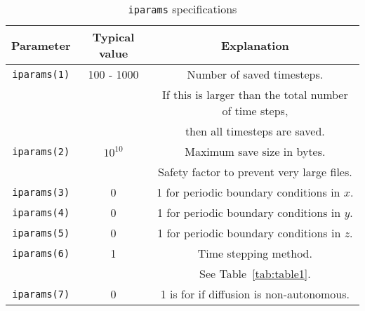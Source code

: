 \documentclass[11pt]{article}
\begin{document}
    \begin{table}
        \centering
        \caption{\texttt{iparams} specifications}
        \label{tab:iparams}
        \begin{tabular}{c | c | c}
            Parameter & Typical value & Explanation\\
            \hline
            \texttt{iparams(1)} & 100 - 1000 & Number of saved timesteps.\\
            & &  If this is larger than the total number of time steps,\\
            & & then all timesteps are saved.\\
            \hline
            \texttt{iparams(2)} & \(10^{10}\) & Maximum save size in bytes.\\
            & & Safety factor to prevent very large files.\\
            \hline
            \texttt{iparams(3)} & 0 & 1 for periodic boundary conditions in \(x\).\\
            \hline
            \texttt{iparams(4)} & 0 & 1 for periodic boundary conditions in \(y\).\\
            \hline
            \texttt{iparams(5)} & 0 & 1 for periodic boundary conditions in \(z\).\\
            \hline
            \texttt{iparams(6)} & 1 & Time stepping method.\\
            & & See Table~\ref{tab:table1}.\\
            \hline
            \texttt{iparams(7)} & 0 & 1 is for if diffusion is non-autonomous.\\
        \end{tabular}
    \end{table}
\end{document}
